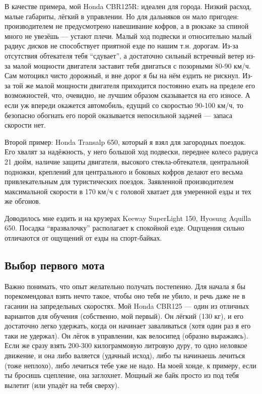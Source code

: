 \documentclass[12pt,a4paper]{article}
\begin{document}
В качестве примера, мой Honda CBR125R: идеален для города. Низкий
расход, малые габариты, лёгкий в управлении. Но для дальняков он мало
пригоден: производителем не предусмотрено навешивание кофров, а в
рюкзаке за спиной много не увезёшь --- устают плечи. Малый ход подвески
и относительно малый радиус дисков не способствует приятной езде по
нашим т.н. дорогам. Из-за отсутствия обтекателя тебя ``сдувает'', а
достаточно сильный встречный ветер из-за малой мощности двигателя
заставит тебя двигаться с позорными 80-90 км/ч. Сам мотоцикл чисто
дорожный, и вне дорог я бы на нём ездить не рискнул.
Из-за той же малой мощности двигателя приходится постоянно ехать на
пределе его возможностей, что, очевидно, не лучшим образом
сказывается на его износе. А если уж впереди окажется автомобиль,
едущий со скоростью 90-100 км/ч, то безопасно обогнать его порой
оказывается непосильной задачей --- запаса скорости нет.

Второй пример: Honda Transalp 650, который я взял для загородных поездок.
Его хвалят за надёжность, у него большой ход подвески, переднее колесо
радиуса 21 дюйм, наличие защиты двигателя, высокого стекла-обтекателя,
центральной подножки, креплений для центрального и боковых кофров делают
его весьма привлекательным для туристических поездок. Заявленной
производителем максимальной скорости в 170 км/ч с головой хватает для
умеренной езды и тех же обгонов.

Доводилось мне ездить и на крузерах Keeway SuperLight 150,
Hyosung Aquilla 650. Посадка ``вразвалочку'' располагает к спокойной езде.
Ощущения сильно отличаются от ощущений от езды на спорт-байках.

\subsection{Выбор первого мота}

Важно понимать, что опыт желательно получать постепенно. Для начала я
бы порекомендовал взять нечто такое, чтобы оно тебя не убило, и речь
даже не в гасании на запредельных скоростях. Мой Honda CBR125 --- один из
отличных вариантов для обучения (собственно, мой первый). Он лёгкий
(130 кг), и его достаточно легко удержать, когда он начинает
заваливаться (хотя один раз я его таки не удержал). Он лёгок в
управлении, как велосипед (образно выражаясь). Если же сразу взять
200-300 килограммовую литровую дуру, то одно неловкое движение, и она
либо валяется (удачный исход), либо ты начинаешь лечиться (тоже
неплохо), либо лечиться тебе уже не надо.
На моей хонде, к примеру, если ты бросишь сцепление, она заглохнет.
Мощный же байк просто из под тебя вылетит (или упадёт на тебя сверху).
\end{document}
